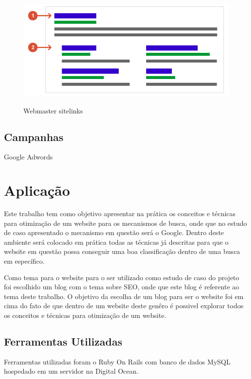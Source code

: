 \documentclass[
	12pt,				%
	openright,			%
	twoside,			%
	a4paper,			%
	english,			%
	french,				%
	spanish,			%
	brazil				%
	]{abntex2}
\begin{document}
\begin{figure}[hbtp]
\caption{Webmaster sitelinks}
\centering
\includegraphics[totalheight=0.5\textheight]{img/webmaster-sitelinks.png}
\label{who}
\end{figure}



\section{Campanhas}

Google Adwords

\chapter{Aplicação}

Este trabalho tem como objetivo apresentar na prática os conceitos e técnicas para otimização de um website para os mecanismos de busca, onde que no estudo de caso apresentado o mecanismo em questão será o Google. Dentro deste ambiente será colocado em prática todas as técnicas já descritas para que o website em questão possa conseguir uma boa classificação dentro de uma busca em específico.

Como tema para o website para o ser utilizado como estudo de caso do projeto foi escolhido um blog com o tema sobre SEO, onde que este blog é referente ao tema deste trabalho. O objetivo da escolha de um blog para ser o website foi em cima do fato de que dentro de um website deste genêro é possivel explorar todos os conceitos e técnicas para otimização de um website.

\section{Ferramentas Utilizadas}

Ferramentas utilizadas foram o Ruby On Rails com banco de dados MySQL hospedado em um servidor na Digital Ocean.
\end{document}
